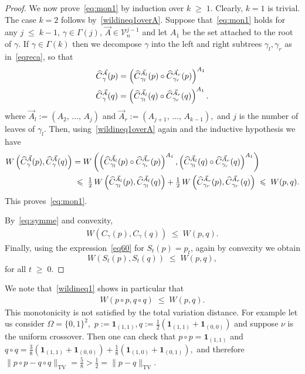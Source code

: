 \documentclass[AHL,Unicode,longabstracts,published]{cedram}
\renewcommand{\leq}{\;\leqslant\;}
\renewcommand{\geq}{\;\geqslant\;}
\newcommand{\Om}{\Omega}
\newcommand{\tv}{\mathrm{TV}}
\newcommand{\IND}{\mathbf{1}}
\newcommand{\cV}{\mathcal{V}}
\let\g=\gamma
\let\G=\Gamma
\let\oldhat\hat
\renewcommand*{\hat}[1]{\mathchoice{\widehat{#1}}{\widehat{#1}}{\oldhat{#1}}{\oldhat{#1}}}
\begin{document}
\begin{proof}
We now prove~\eqref{eq:mon1} by induction over $k\geq 1$. Clearly, $k=1$ is trivial. The case $k=2$ follows by~\eqref{wildineq1overA}. Suppose that~\eqref{eq:mon1} holds for any $j\leq k-1$, $\g\in\G(j)$, $\vec A\in \cV_n^{j-1}$ and let $A_1$ be the set attached to the root of $\gamma$. If $\gamma \in \Gamma(k)$ then we decompose $\g$ into the left and right subtrees $\g_l,\g_r$ as in~\eqref{eqreca}, so that
\begin{align*}
& \hat{C}^{\vec A}_{\gamma}(p) = \left(\hat{C}^{\vec{A}_{l}}_{\gamma_l}(p)\circ \hat{C}^{\vec{A}_{r}}_{\gamma_r}(p)\right)^{A_1} \\
&\hat{C}^{\vec A}_{\gamma}(q) = \left(\hat{C}^{\vec{A}_{l}}_{\gamma_l}(q)\circ \hat{C}^{\vec{A}_{r}}_{\gamma_r}(q)\right)^{A_1}.
\end{align*}
where $\vec{A}_{l} :=(A_2,\,\dots,\,A_j)$ and $\vec{A}_{r} :=(A_{j+1},\,\dots,\,A_{k-1}),$ and $j$ is the number of leaves of $\g_l.$ Then, using~\eqref{wildineq1overA} again and the inductive hypothesis we have
\begin{align*}
W\left(\hat{C}^{\vec A}_{\gamma}(p),\hat{C}^{\vec A}_{\gamma}(q)\right) &= W\left(\left(\hat{C}^{\vec{A}_{l}}_{\gamma_l}(p)\circ \hat{C}^{\vec{A}_{r}}_{\gamma_r}(p)\right)^{A_1},\left(\hat{C}^{\vec{A}_{l}}_{\gamma_l}(q)\circ \hat{C}^{\vec{A}_{r}}_{\gamma_r}(q)\right)^{A_1}\right) \\
& \leq \tfrac{1}{2}\,W\left(\hat{C}^{\vec{A}_{l}}_{\gamma_l}(p),\hat{C}^{\vec{A}_{l}}_{\gamma_l}(q)\right) + \tfrac{1}{2}\,W\left(\hat{C}^{\vec{A}_{r}}_{\gamma_r}(p), \hat{C}^{\vec{A}_{r}}_{\gamma_r}(q)\right)
\leq W(p,q).
\end{align*}
This proves~\eqref{eq:mon1}.

By~\eqref{eq:symme} and convexity,
\begin{align}\label{wildineq3}
W(C_{\gamma}(p),C_{\gamma}(q))\leq W(p,q).
\end{align}
Finally, using the expression~\eqref{eq60} for $S_t(p)=p_t$, again by convexity we obtain
\[
W(S_t(p),S_t(q))\leq W(p,q),
\]
for all $t\geq 0$.
\end{proof}



\begin{rema}\label{rem:mono}
We note that~\eqref{wildineq1} shows in particular that
\begin{align}\label{wildineq21}
W\left(p\circ p,q\circ q\right) \leq W\left(p,q\right).
\end{align}
This monotonicity is not satisfied by the total variation distance. For example let us consider $\Om=\{0,1\}^2,$ $p:=\IND_{(1,1)}, q:=\frac 12(\IND_{(1,1)}+\IND_{(0,0)})$ and suppose $\nu$ is the uniform crossover. Then one can check that $p \circ p = \IND_{(1,1)}$ and $q \circ q = \frac{3}8(\IND_{(1,1)}+\IND_{(0,0)}) + \frac{1}8(\IND_{(1,0)}+\IND_{(0,1)}),$ and therefore $\|p \circ p - q \circ q\|_\tv = \frac 58 > \frac 12 = \|p-q\|_\tv.$
\end{rema}
\end{document}
